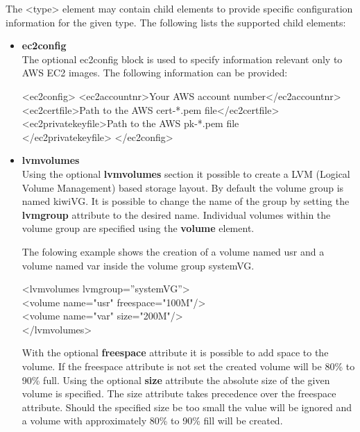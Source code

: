 The <type> element may contain child elements to provide specific
configuration information for the given type. The following lists the 
supported child elements:

\begin{itemize}
\item \textbf{ec2config}\\
    The optional ec2config block is used to specify information relevant
    only to AWS EC2 images. The following information can be provided:

    \begin{Command}{12cm}
    <ec2config>
    \hspace*{1cm}<ec2accountnr>Your AWS account number</ec2accountnr>
    \hspace*{1cm}<ec2certfile>Path to the AWS cert-*.pem file</ec2certfile>
    \hspace*{1cm}<ec2privatekeyfile>Path to the AWS pk-*.pem file\\
       </ec2privatekeyfile>
    </ec2config>
    \end{Command}

\item \textbf{lvmvolumes}\\
	Using the optional \textbf{lvmvolumes} section it possible to create
    a LVM (Logical Volume Management) based storage layout. By default the
    volume group is named kiwiVG. It is possible to change the name of the
    group by setting the \textbf{lvmgroup} attribute to the desired name.
    Individual volumes within the volume group are specified using the 
    \textbf{volume} element. 

    The folowing example shows the creation of a volume named usr and a
    volume named var inside the volume group systemVG.

	\begin{Command}{12cm}
	<lvmvolumes lvmgroup=''systemVG''>\\
	\hspace*{1cm}<volume name="usr" freespace="100M"/>\\
	\hspace*{1cm}<volume name="var" size="200M"/>\\
	</lvmvolumes>
	\end{Command}

	With the optional \textbf{freespace} attribute it is possible to
    add space to the volume. If the freespace attribute is not set the
    created volume will be 80\% to 90\% full. Using the optional
    \textbf{size} attribute the absolute size of the given volume is
    specified. The size attribute takes precedence over the freespace
    attribute. Should the specified size be too small the value will
    be ignored and a volume with approximately 80\% to 90\% fill will
    be created.


\end{itemize}
